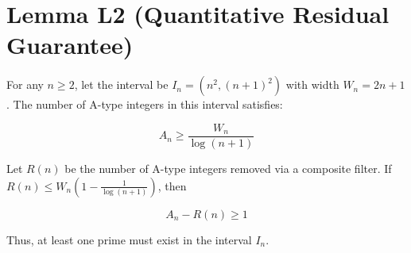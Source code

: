 
\section*{Lemma L2 (Quantitative Residual Guarantee)}

For any \( n \geq 2 \), let the interval be \( I_n = (n^2, (n+1)^2) \) with width \( W_n = 2n + 1 \).  
The number of A-type integers in this interval satisfies:

\[
A_n \geq \frac{W_n}{\log(n+1)}
\]

Let \( R(n) \) be the number of A-type integers removed via a composite filter.  
If \( R(n) \leq W_n \left(1 - \frac{1}{\log(n+1)}\right) \), then

\[
A_n - R(n) \geq 1
\]

Thus, at least one prime must exist in the interval \( I_n \).
